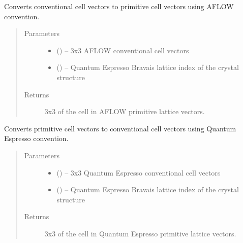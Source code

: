 \documentclass[letterpaper,10pt,english]{sphinxmanual}
\begin{document}
\begin{fulllineitems}
\label{\detokenize{retr:retr.aflow_conv2prim}}
Converts conventional cell vectors to primitive cell vectors using AFLOW
convention.
\begin{quote}\begin{description}
\item[{Parameters}] \leavevmode\begin{itemize}
\item {} 
 () -- 3x3 AFLOW conventional cell vectors

\item {} 
 () -- Quantum Espresso Bravais lattice index of the crystal
structure

\end{itemize}

\item[{Returns}] \leavevmode
3x3  of the cell in AFLOW primitive lattice vectors.

\end{description}\end{quote}

\end{fulllineitems}


\begin{fulllineitems}
\label{\detokenize{retr:retr.qe_prim2conv}}
Converts primitive cell vectors to conventional cell vectors using Quantum
Espresso convention.
\begin{quote}\begin{description}
\item[{Parameters}] \leavevmode\begin{itemize}
\item {} 
 () -- 3x3 Quantum Espresso conventional cell vectors

\item {} 
 () -- Quantum Espresso Bravais lattice index of the crystal
structure

\end{itemize}

\item[{Returns}] \leavevmode
3x3  of the cell in Quantum Espresso primitive lattice
vectors.

\end{description}\end{quote}

\end{fulllineitems}
\end{document}
